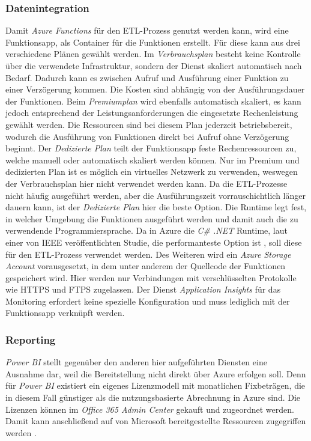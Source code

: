 \subsubsection{Datenintegration} \label{subsec:infra:konfig:functions}
Damit \textit{Azure Functions} für den ETL-Prozess genutzt werden kann, wird eine Funktionsapp, als Container für die Funktionen erstellt. Für diese kann aus drei verschiedene Plänen gewählt werden. Im \textit{Verbrauchsplan} besteht keine Kontrolle über die verwendete Infrastruktur, sondern der Dienst skaliert automatisch nach Bedarf. Dadurch kann es zwischen Aufruf und Ausführung einer Funktion zu einer Verzögerung kommen. Die Kosten sind abhängig von der Ausführungsdauer der Funktionen. Beim \textit{Premiumplan} wird ebenfalls automatisch skaliert, es kann jedoch entsprechend der Leistungsanforderungen die eingesetzte Rechenleistung gewählt werden. Die Ressourcen sind bei diesem Plan jederzeit betriebsbereit, wodurch die Ausführung von Funktionen direkt bei Aufruf ohne Verzögerung beginnt. Der \textit{Dedizierte Plan} teilt der Funktionsapp feste Rechenressourcen zu, welche manuell oder automatisch skaliert werden können. Nur im Premium und dedizierten Plan ist es möglich ein virtuelles Netzwerk zu verwenden, weswegen der Verbrauchsplan hier nicht verwendet werden kann. Da die ETL-Prozesse nicht häufig ausgeführt werden, aber die Ausführungszeit vorrauschichtlich länger dauern kann, ist der \textit{Dedizierte Plan} hier die beste Option. Die Runtime legt fest, in welcher Umgebung die Funktionen ausgeführt werden und damit auch die zu verwendende Programmiersprache. Da in Azure die \textit{C\# .NET} Runtime, laut einer von IEEE veröffentlichten Studie, die performanteste Option ist \cite{jackson_investigation_2018}, soll diese für den ETL-Prozess verwendet werden. Des Weiteren wird ein \textit{Azure Storage Account} vorausgesetzt, in dem unter anderem der Quellcode der Funktionen gespeichert wird. Hier werden nur Verbindungen mit verschlüsselten Protokolle wie HTTPS und FTPS zugelassen. Der Dienst \textit{Application Insights} für das Monitoring erfordert keine spezielle Konfiguration und muss lediglich mit der Funktionsapp verknüpft werden. \cite[vgl.][]{satapathi_hands-azure_2021}

\subsubsection{Reporting} \label{subsec:infra:konfig:powerbi}
\textit{Power BI} stellt gegenüber den anderen hier aufgeführten Diensten eine Ausnahme dar, weil die Bereitstellung nicht direkt über Azure erfolgen soll. Denn für  \textit{Power BI} existiert ein eigenes Lizenzmodell mit monatlichen Fixbeträgen, die in diesem Fall günstiger als die nutzungsbasierte Abrechnung in Azure sind. Die Lizenzen können im \textit{Office 365 Admin Center} gekauft und zugeordnet werden. Damit kann anschließend auf von Microsoft bereitgestellte Ressourcen zugegriffen werden \cite[vgl.][]{gunnarsson_pro_2020}.

